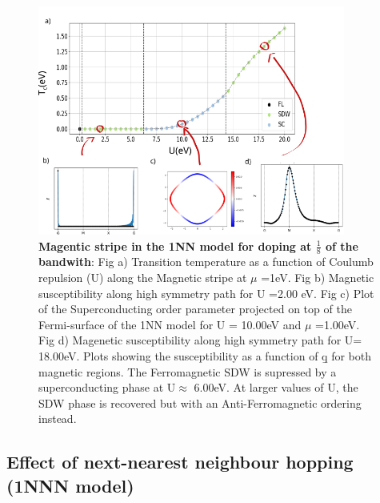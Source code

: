 \documentclass[12pt]{article}
\begin{document}
\begin{figure}[htbp]  %
    \centering
    \includegraphics[width=0.9\textwidth]{1NNstripes.png}  %
    \caption{\textbf{Magentic stripe in the 1NN model for doping at $\frac{1}{8}$ of the bandwith}: Fig a) Transition temperature as a function of Coulumb repulsion (U) along the Magnetic stripe at $\mu$ =1eV. 
       Fig b) Magnetic susceptibility along high symmetry path for U =2.00 eV. 
       Fig c) Plot of the Superconducting order parameter projected on top of the Fermi-surface of the 1NN model for U = 10.00eV and $\mu$ =1.00eV.
       Fig d) Magenetic susceptibility along high symmetry path for U= 18.00eV. Plots showing the susceptibility as a function of \b{q} for both magnetic regions. The Ferromagnetic SDW is supressed by a superconducting phase at U$\approx$ 6.00eV. At larger values of U,  the SDW phase is recovered but with an Anti-Ferromagnetic ordering instead.  }
    \label{fig:1NN_stripes}
\end{figure}


\subsection{Effect of next-nearest neighbour hopping (1NNN model)}
\label{subsec:1NNNModel}
\end{document}
